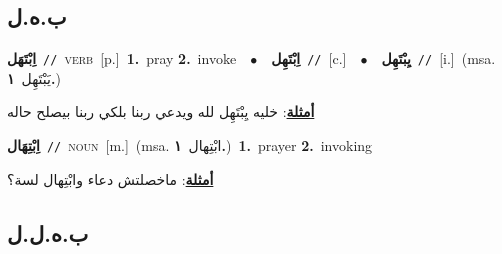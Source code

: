 \documentclass[10pt,a4paper,twoside]{article} %
\begin{document}
\begin{multicols}{2}
\vspace{-3mm}
\subsection*{\color{blue}\foreignlanguage{arabic}{ب.ه.ل}\color{blue}{}} 

{\setlength\topsep{0pt}\textbf{\foreignlanguage{arabic}{اِبْتَهَل}}\ {\color{gray}\texttt{//}\color{black}}\ \textsc{verb}\ [p.]\ \textbf{1.}~pray  \textbf{2.}~invoke\ \ $\bullet$\ \ \setlength\topsep{0pt}\textbf{\foreignlanguage{arabic}{اِبْتَهِل}}\ {\color{gray}\texttt{//}\color{black}}\ [c.]\ \ $\bullet$\ \ \setlength\topsep{0pt}\textbf{\foreignlanguage{arabic}{يِبْتَهِل}}\ {\color{gray}\texttt{//}\color{black}}\ [i.]\ \color{gray}(msa. \foreignlanguage{arabic}{يَبْتَهِل}~\foreignlanguage{arabic}{\textbf{١.}})\color{black}\  \begin{flushright}\color{gray}\foreignlanguage{arabic}{\textbf{\underline{\foreignlanguage{arabic}{أمثلة}}}: خليه يِبْتَهِل لله ويدعي ربنا بلكي ربنا بيصلح حاله}\end{flushright}\color{black}} \vspace{2mm}

{\setlength\topsep{0pt}\textbf{\foreignlanguage{arabic}{اِبْتِهَال}}\ {\color{gray}\texttt{//}\color{black}}\ \textsc{noun}\ [m.]\ \color{gray}(msa. \foreignlanguage{arabic}{ابْتِهال}~\foreignlanguage{arabic}{\textbf{١.}})\color{black}\ \textbf{1.}~prayer  \textbf{2.}~invoking\  \begin{flushright}\color{gray}\foreignlanguage{arabic}{\textbf{\underline{\foreignlanguage{arabic}{أمثلة}}}: ماخصلتش دعاء وابْتِهال لسة؟}\end{flushright}\color{black}} \vspace{2mm}

\vspace{-3mm}
\subsection*{\color{blue}\foreignlanguage{arabic}{ب.ه.ل.ل}\color{blue}{}} 


\end{multicols}
\end{document}
